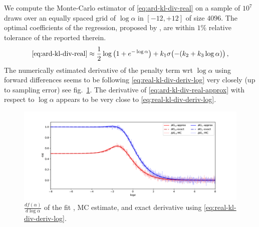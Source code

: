 \documentclass[a4paper,10pt]{article}
\begin{document}
We compute the Monte-Carlo estimator of \eqref{eq:ard-kl-div-real} on a sample of $10^7$
draws over an equally spaced grid of $\log \alpha$ in $[-12, +12]$ of size $4096$. The optimal
coefficients of the regression, proposed by \citep{molchanov_variational_2017}, are within
$1\%$ relative tolerance of the reported therein.
\begin{equation}  \label{eq:ard-kl-div-real-approx}
  \eqref{eq:ard-kl-div-real}
  \approx
    \frac12 \log{\bigl(1 + e^{-\log \alpha}\bigr)}
    + k_1 \sigma\bigl(- (k_2 + k_3 \log \alpha)\bigr)
  \,,
\end{equation}
The numerically estimated derivative of the penalty term wrt $\log \alpha$ using forward
differences seems to be following \eqref{eq:real-kl-div-deriv-log} very closely (up to
sampling error) see fig.~\ref{fig:molchanov-derivative-replica}. The derivative of
\eqref{eq:ard-kl-div-real-approx} with respect to $\log \alpha$ appears to be very close
to \eqref{eq:real-kl-div-deriv-log}.

\begin{figure}[!ht]
  \centering
  \includegraphics[width=1.\linewidth]{../notebooks/assets/grad_log.pdf}
  \caption{$\tfrac{d f(\alpha)}{d \log{\alpha}}$ of the fit \citep{molchanov_variational_2017},
  MC estimate, and exact derivative using \eqref{eq:real-kl-div-deriv-log}.}
  \label{fig:molchanov-derivative-replica}
\end{figure}
\end{document}
